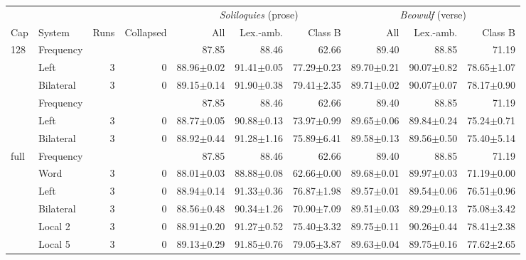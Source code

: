 \begin{tabular}{@{}llrrrrrrrr@{}}
\toprule
 & & & & \multicolumn{3}{c}{\textit{Soliloquies} (prose)} & \multicolumn{3}{c}{\textit{Beowulf} (verse)} \\
\cmidrule(lr){5-7}\cmidrule(l){8-10}
Cap & System & Runs & Collapsed & All & Lex.-amb. & Class B & All & Lex.-amb. & Class B \\
\midrule
128 & Frequency & & & 87.85 & 88.46 & 62.66 & 89.40 & 88.85 & 71.19 \\
 & Left & 3 & 0 & 88.96$\pm$0.02 & 91.41$\pm$0.05 & 77.29$\pm$0.23 & 89.70$\pm$0.21 & 90.07$\pm$0.82 & 78.65$\pm$1.07 \\
 & Bilateral & 3 & 0 & 89.15$\pm$0.14 & 91.90$\pm$0.38 & 79.41$\pm$2.35 & 89.71$\pm$0.02 & 90.07$\pm$0.07 & 78.17$\pm$0.90 \\
\addlinespace
256 & Frequency & & & 87.85 & 88.46 & 62.66 & 89.40 & 88.85 & 71.19 \\
 & Left & 3 & 0 & 88.77$\pm$0.05 & 90.88$\pm$0.13 & 73.97$\pm$0.99 & 89.65$\pm$0.06 & 89.84$\pm$0.24 & 75.24$\pm$0.71 \\
 & Bilateral & 3 & 0 & 88.92$\pm$0.44 & 91.28$\pm$1.16 & 75.89$\pm$6.41 & 89.58$\pm$0.13 & 89.56$\pm$0.50 & 75.40$\pm$5.14 \\
\addlinespace
full & Frequency & & & 87.85 & 88.46 & 62.66 & 89.40 & 88.85 & 71.19 \\
 & Word & 3 & 0 & 88.01$\pm$0.03 & 88.88$\pm$0.08 & 62.66$\pm$0.00 & 89.68$\pm$0.01 & 89.97$\pm$0.03 & 71.19$\pm$0.00 \\
 & Left & 3 & 0 & 88.94$\pm$0.14 & 91.33$\pm$0.36 & 76.87$\pm$1.98 & 89.57$\pm$0.01 & 89.54$\pm$0.06 & 76.51$\pm$0.96 \\
 & Bilateral & 3 & 0 & 88.56$\pm$0.48 & 90.34$\pm$1.26 & 70.90$\pm$7.09 & 89.51$\pm$0.03 & 89.29$\pm$0.13 & 75.08$\pm$3.42 \\
 & Local 2 & 3 & 0 & 88.91$\pm$0.20 & 91.27$\pm$0.52 & 75.40$\pm$3.32 & 89.75$\pm$0.11 & 90.26$\pm$0.44 & 78.41$\pm$2.38 \\
 & Local 5 & 3 & 0 & 89.13$\pm$0.29 & 91.85$\pm$0.76 & 79.05$\pm$3.87 & 89.63$\pm$0.04 & 89.75$\pm$0.16 & 77.62$\pm$2.65 \\
\bottomrule
\end{tabular}
